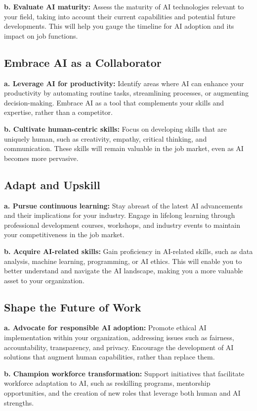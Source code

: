 \textbf{b. Evaluate AI maturity:} Assess the maturity of AI technologies relevant to your field, taking into account their current capabilities and potential future developments. This will help you gauge the timeline for AI adoption and its impact on job functions.

\subsection{Embrace AI as a Collaborator}

\textbf{a. Leverage AI for productivity:} Identify areas where AI can enhance your productivity by automating routine tasks, streamlining processes, or augmenting decision-making. Embrace AI as a tool that complements your skills and expertise, rather than a competitor.

\textbf{b. Cultivate human-centric skills:} Focus on developing skills that are uniquely human, such as creativity, empathy, critical thinking, and communication. These skills will remain valuable in the job market, even as AI becomes more pervasive.

\subsection{Adapt and Upskill}

\textbf{a. Pursue continuous learning:} Stay abreast of the latest AI advancements and their implications for your industry. Engage in lifelong learning through professional development courses, workshops, and industry events to maintain your competitiveness in the job market.

\textbf{b. Acquire AI-related skills:} Gain proficiency in AI-related skills, such as data analysis, machine learning, programming, or AI ethics. This will enable you to better understand and navigate the AI landscape, making you a more valuable asset to your organization.

\subsection{Shape the Future of Work}

\textbf{a. Advocate for responsible AI adoption:} Promote ethical AI implementation within your organization, addressing issues such as fairness, accountability, transparency, and privacy. Encourage the development of AI solutions that augment human capabilities, rather than replace them.

\textbf{b. Champion workforce transformation:} Support initiatives that facilitate workforce adaptation to AI, such as reskilling programs, mentorship opportunities, and the creation of new roles that leverage both human and AI strengths.

